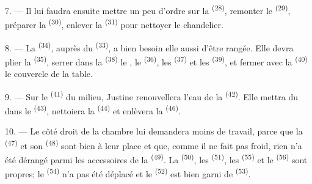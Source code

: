 7. --- Il lui faudra ensuite mettre un peu d'ordre sur la  \textsuperscript{(28)}, remonter le 
\textsuperscript{(29)}, préparer la  \textsuperscript{(30)},
enlever la  \textsuperscript{(31)} pour nettoyer le
chandelier.

\VUsaut{5.0mm}
\VUsaut{3.0mm}

8. --- La  \textsuperscript{(34)}, auprès du
 \textsuperscript{(33)}, a bien besoin elle aussi d'être
rangée. Elle devra plier la  \textsuperscript{(35)}, serrer
dans la  \textsuperscript{(38)} le , le
 \textsuperscript{(36)}, les 
\textsuperscript{(37)} et les  \textsuperscript{(39)}, et
fermer avec la  \textsuperscript{(40)} le couvercle de la table.

9. --- Sur le  \textsuperscript{(41)} du milieu, Justine
renouvellera l'eau de la  \textsuperscript{(42)}. Elle mettra du
 dans le  \textsuperscript{(43)}, nettoiera la
 \textsuperscript{(44)} et enlèvera la  \textsuperscript{(46)}.

10. --- Le côté droit de la chambre lui demandera moins de travail, parce que
la  \textsuperscript{(47)} et son 
\textsuperscript{(48)} sont bien à leur place et que, comme il ne fait pas
froid, rien n'a été dérangé parmi les accessoires de la 
\textsuperscript{(49)}. La  \textsuperscript{(50)}, les
 \textsuperscript{(51)}, les 
\textsuperscript{(55)} et le  \textsuperscript{(56)} sont
propres; le  \textsuperscript{(54)} n'a pas été déplacé et le
 \textsuperscript{(52)} est bien garni de
 \textsuperscript{(53)}.



